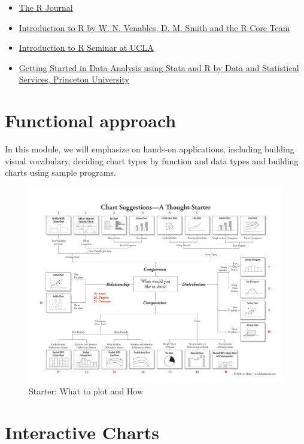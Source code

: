 \documentclass[
]{book}
\providecommand{\tightlist}{%
  \setlength{\itemsep}{0pt}\setlength{\parskip}{0pt}}
\begin{document}
\begin{itemize}
\tightlist
\item
  \href{http://journal.r-project.org/}{The R Journal}
\item
  \href{http://cran.r-project.org/doc/manuals/R-intro.pdf}{Introduction to R by W. N. Venables, D. M. Smith and the R Core Team}
\item
  \href{http://www.ats.ucla.edu/stat/r/seminars/intro.htm}{Introduction to R Seminar at UCLA}
\item
  \href{https://dss.princeton.edu/training/}{Getting Started in Data Analysis using Stata and R by Data and Statistical Services, Princeton University}
\end{itemize}

\hypertarget{functional}{%
\chapter{Functional approach}\label{functional}}

In this module, we will emphasize on hands-on applications, including building visual vocabulary, deciding chart types by function and data types and building charts using sample programs.

\begin{figure}
\centering
\includegraphics{images/choosing_a_good_chart1-21.png}
\caption{Starter: What to plot and How}
\end{figure}

\hypertarget{interactive}{%
\chapter{Interactive Charts}\label{interactive}}
\end{document}
